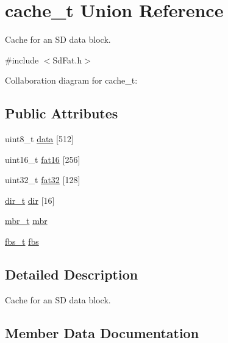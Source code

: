 \hypertarget{unioncache__t}{}\section{cache\+\_\+t Union Reference}
\label{unioncache__t}


Cache for an SD data block.  




{\ttfamily \#include $<$Sd\+Fat.\+h$>$}



Collaboration diagram for cache\+\_\+t\+:
\subsection*{Public Attributes}
\begin{DoxyCompactItemize}
\item 
uint8\+\_\+t \hyperlink{unioncache__t_ae675b7a3a87d809070de111d1d1f1d81}{data} \mbox{[}512\mbox{]}
\item 
uint16\+\_\+t \hyperlink{unioncache__t_a8f3a4e9392a7d8ace954fc44c57df887}{fat16} \mbox{[}256\mbox{]}
\item 
uint32\+\_\+t \hyperlink{unioncache__t_a57e16421bf460d1ba6cb9ce9a23a4a83}{fat32} \mbox{[}128\mbox{]}
\item 
\hyperlink{_fat_structs_8h_a803db59d4e16a0c54a647afc6a7954e3}{dir\+\_\+t} \hyperlink{unioncache__t_a7396fdbdb7c52bd1d72c5329ff32acd1}{dir} \mbox{[}16\mbox{]}
\item 
\hyperlink{_fat_structs_8h_a7c429e5097f101c8c97663d6c4155bd9}{mbr\+\_\+t} \hyperlink{unioncache__t_a6ac10bfb1ebb1139c448456679663bb6}{mbr}
\item 
\hyperlink{_fat_structs_8h_a91a3979f1149ff688d0d8bb696bc2887}{fbs\+\_\+t} \hyperlink{unioncache__t_a0691515e5d969f98c4285bfe0c16a309}{fbs}
\end{DoxyCompactItemize}


\subsection{Detailed Description}
Cache for an SD data block. 

\subsection{Member Data Documentation}
\mbox{\label{unioncache__t_ae675b7a3a87d809070de111d1d1f1d81}} 
